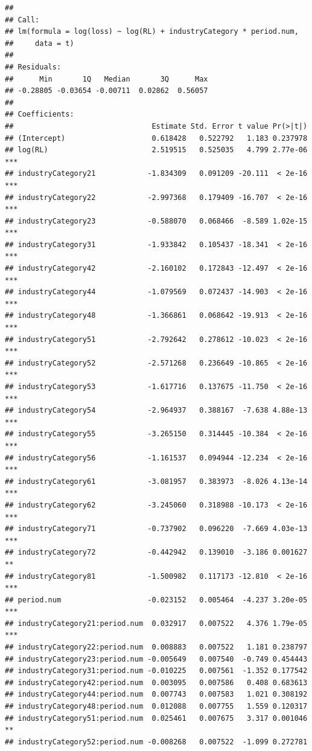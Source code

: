\documentclass[
]{article}
\begin{document}
\begin{verbatim}
## 
## Call:
## lm(formula = log(loss) ~ log(RL) + industryCategory * period.num, 
##     data = t)
## 
## Residuals:
##      Min       1Q   Median       3Q      Max 
## -0.28805 -0.03654 -0.00711  0.02862  0.56057 
## 
## Coefficients:
##                                Estimate Std. Error t value Pr(>|t|)    
## (Intercept)                    0.618428   0.522792   1.183 0.237978    
## log(RL)                        2.519515   0.525035   4.799 2.77e-06 ***
## industryCategory21            -1.834309   0.091209 -20.111  < 2e-16 ***
## industryCategory22            -2.997368   0.179409 -16.707  < 2e-16 ***
## industryCategory23            -0.588070   0.068466  -8.589 1.02e-15 ***
## industryCategory31            -1.933842   0.105437 -18.341  < 2e-16 ***
## industryCategory42            -2.160102   0.172843 -12.497  < 2e-16 ***
## industryCategory44            -1.079569   0.072437 -14.903  < 2e-16 ***
## industryCategory48            -1.366861   0.068642 -19.913  < 2e-16 ***
## industryCategory51            -2.792642   0.278612 -10.023  < 2e-16 ***
## industryCategory52            -2.571268   0.236649 -10.865  < 2e-16 ***
## industryCategory53            -1.617716   0.137675 -11.750  < 2e-16 ***
## industryCategory54            -2.964937   0.388167  -7.638 4.88e-13 ***
## industryCategory55            -3.265150   0.314445 -10.384  < 2e-16 ***
## industryCategory56            -1.161537   0.094944 -12.234  < 2e-16 ***
## industryCategory61            -3.081957   0.383973  -8.026 4.13e-14 ***
## industryCategory62            -3.245060   0.318988 -10.173  < 2e-16 ***
## industryCategory71            -0.737902   0.096220  -7.669 4.03e-13 ***
## industryCategory72            -0.442942   0.139010  -3.186 0.001627 ** 
## industryCategory81            -1.500982   0.117173 -12.810  < 2e-16 ***
## period.num                    -0.023152   0.005464  -4.237 3.20e-05 ***
## industryCategory21:period.num  0.032917   0.007522   4.376 1.79e-05 ***
## industryCategory22:period.num  0.008883   0.007522   1.181 0.238797    
## industryCategory23:period.num -0.005649   0.007540  -0.749 0.454443    
## industryCategory31:period.num -0.010225   0.007561  -1.352 0.177542    
## industryCategory42:period.num  0.003095   0.007586   0.408 0.683613    
## industryCategory44:period.num  0.007743   0.007583   1.021 0.308192    
## industryCategory48:period.num  0.012088   0.007755   1.559 0.120317    
## industryCategory51:period.num  0.025461   0.007675   3.317 0.001046 ** 
## industryCategory52:period.num -0.008268   0.007522  -1.099 0.272781    

\end{verbatim}
\end{document}
